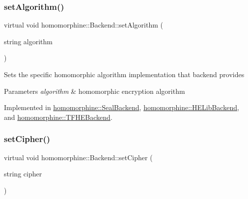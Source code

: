 \mbox{\label{classhomomorphine_1_1_backend_a69cc49ddff047e257a7d793ac240b08b}} 
\subsubsection{\texorpdfstring{setAlgorithm()}{setAlgorithm()}}
{\footnotesize\ttfamily virtual void homomorphine\+::\+Backend\+::set\+Algorithm (\begin{DoxyParamCaption}\item[{string}]{algorithm }\end{DoxyParamCaption})\hspace{0.3cm}{\ttfamily [pure virtual]}}

Sets the specific homomorphic algorithm implementation that backend provides


\begin{DoxyParams}{Parameters}
{\em algorithm} & homomorphic encryption algorithm \\
\hline
\end{DoxyParams}


Implemented in \mbox{\hyperlink{classhomomorphine_1_1_seal_backend_a46a336bca80c5450a1f3ea1125d0d0e8}{homomorphine\+::\+Seal\+Backend}}, \mbox{\hyperlink{classhomomorphine_1_1_h_e_lib_backend_a39478377b0e299fd90f5c7bb6c8efe89}{homomorphine\+::\+H\+E\+Lib\+Backend}}, and \mbox{\hyperlink{classhomomorphine_1_1_t_f_h_e_backend_a2994dbb99c71f3edc316598f51454b6e}{homomorphine\+::\+T\+F\+H\+E\+Backend}}.

\mbox{\label{classhomomorphine_1_1_backend_a29f49f5c862cf090ac98ade663e67c64}} 
\subsubsection{\texorpdfstring{setCipher()}{setCipher()}}
{\footnotesize\ttfamily virtual void homomorphine\+::\+Backend\+::set\+Cipher (\begin{DoxyParamCaption}\item[{string}]{cipher }\end{DoxyParamCaption})\hspace{0.3cm}{\ttfamily [pure virtual]}}

